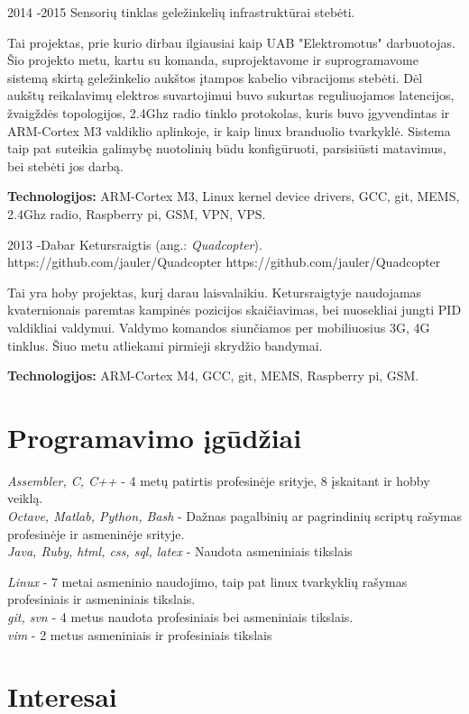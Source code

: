 \documentclass[12]{article}
\begin{document}
\job
{2014 -}{2015}
{Sensorių tinklas geležinkelių infrastruktūrai stebėti.}
{}
{}
{
Tai projektas, prie kurio dirbau ilgiausiai kaip UAB "Elektromotus" darbuotojas.
Šio projekto metu, kartu su komanda, suprojektavome ir suprogramavome sistemą skirtą geležinkelio aukštos įtampos kabelio vibracijoms stebėti.
Dėl aukštų reikalavimų elektros suvartojimui buvo sukurtas reguliuojamos latencijos, žvaigždės topologijos, 2.4Ghz radio tinklo protokolas, kuris buvo įgyvendintas ir ARM-Cortex M3 valdiklio aplinkoje, ir kaip linux branduolio tvarkyklė.
Sistema taip pat suteikia galimybę nuotolinių būdu konfigūruoti, parsisiūsti matavimus, bei stebėti jos darbą.\\
\rule{0mm}{5mm}\textbf{Technologijos:} ARM-Cortex M3, Linux kernel device drivers, GCC, git, MEMS, 2.4Ghz radio, Raspberry pi, GSM, VPN, VPS.}

\job
{2013 -}{Dabar}
{Ketursraigtis (ang.: \textit{Quadcopter}).}
{https://github.com/jauler/Quadcopter}
{https://github.com/jauler/Quadcopter}
{Tai yra hoby projektas, kurį darau laisvalaikiu.
Ketursraigtyje naudojamas kvaternionais paremtas kampinės pozicijos skaičiavimas, bei nuosekliai jungti PID valdikliai valdymui.
Valdymo komandos siunčiamos per mobiliuosius 3G, 4G tinklus.
Šiuo metu atliekami pirmieji skrydžio bandymai.\\
\rule{0mm}{5mm}\textbf{Technologijos:} ARM-Cortex M4, GCC, git, MEMS, Raspberry pi, GSM.}


\section{Programavimo įgūdžiai}

{
	\textit{Assembler, C, C++} - 4 metų patirtis profesinėje srityje, 8 įskaitant ir hobby veiklą.\\
	\textit{Octave, Matlab, Python, Bash} - Dažnas pagalbinių ar pagrindinių scriptų rašymas profesinėje ir asmeninėje srityje.\\
	\textit{Java, Ruby, html, css, sql, latex} - Naudota asmeniniais tikslais \\

}

{
	\textit{Linux} - 7 metai asmeninio naudojimo, taip pat linux tvarkyklių rašymas profesiniais ir asmeniniais tikslais.\\
	\textit{git, svn} - 4 metus naudota profesiniais bei asmeniniais tikslais.\\
	\textit{vim} - 2 metus asmeniniais ir profesiniais tikslais\\
}


\section{Interesai}

\end{document}
